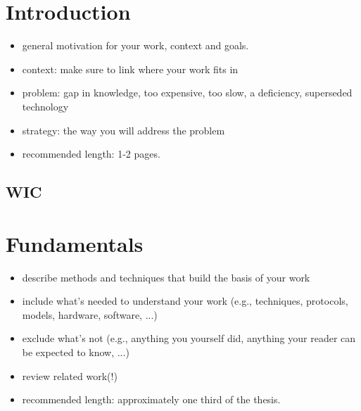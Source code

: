 \documentclass[]{nsm-thesis}
\begin{document}
\cleardoublepage
{}


\chapter{Introduction}
\label{sec:introduction}

\begin{itemize}
\item general motivation for your work, context and goals.
\item context: make sure to link where your work fits in
\item problem: gap in knowledge, too expensive, too slow, a deficiency, superseded technology
\item strategy: the way you will address the problem
\item recommended length: 1-2 pages.
\end{itemize}

\section{\acl{WIC}}



\chapter{Fundamentals}
\label{sec:fundamentals}


\begin{itemize}
\item describe methods and techniques that build the basis of your work
\item include what's needed to understand your work (e.g., techniques, protocols, models, hardware, software, ...)
\item exclude what's not (e.g., anything you yourself did, anything your reader can be expected to know, ...)
\item review related work(!)
\item recommended length: approximately one third of the thesis.
\end{itemize}

\end{document}
